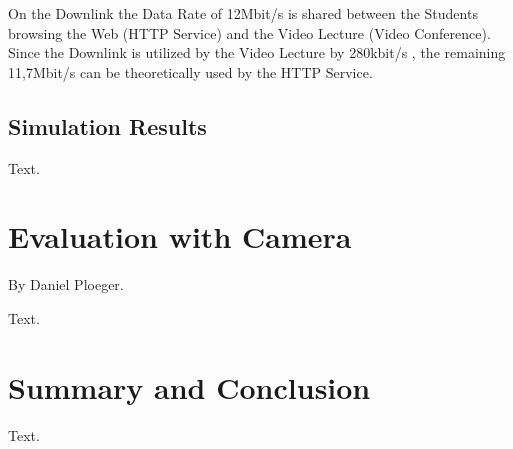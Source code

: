 \documentclass[a4paper,10pt]{book}\usepackage{graphicx}
\begin{document}
On the Downlink the Data Rate of 12Mbit/s is shared between the Students browsing the Web (HTTP Service) and the Video Lecture (Video Conference).
Since the Downlink is utilized by the Video Lecture by 280kbit/s , the remaining 11,7Mbit/s 
can be theoretically used by the HTTP Service.

\section{Simulation Results}

Text.




\chapter{Evaluation with Camera}
By Daniel Ploeger.

Text.
         

\chapter{Summary and Conclusion}

Text.
\end{document}
